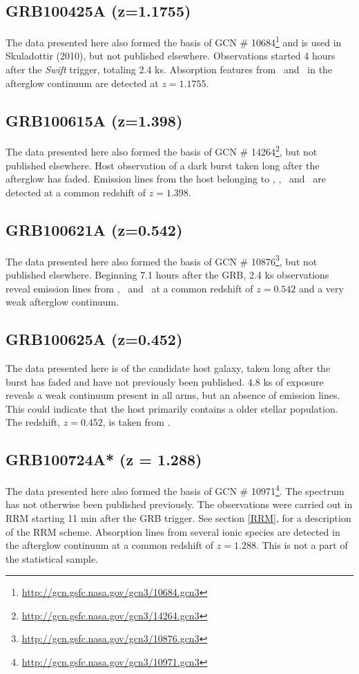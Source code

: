 \documentclass{aa}    %
\begin{document}
\subsection{GRB100425A (z=1.1755)}
The data presented here also formed the basis of GCN \#
10684\footnote{\url{http://gcn.gsfc.nasa.gov/gcn3/10684.gcn3}} and is used in
Skuladottir (2010), but not published elsewhere. Observations started 4
hours after the \textit{Swift} trigger, totaling 2.4 ks. Absorption features
from \mgii~and \feii~in the afterglow continuum are detected at $z=1.1755$.

\subsection{GRB100615A (z=1.398)}
The data presented here also formed the basis of GCN \#
14264\footnote{\url{http://gcn.gsfc.nasa.gov/gcn3/14264.gcn3}}, but not
published elsewhere. Host observation of a dark burst\citep{DElia2011} taken
long after the afterglow has faded. Emission lines from the host belonging to
\oii, \neiii, \oiii~and \ha~are detected at a common redshift of $z=1.398$.

\subsection{GRB100621A (z=0.542)}
The data presented here also formed the basis of GCN \#
10876\footnote{\url{http://gcn.gsfc.nasa.gov/gcn3/10876.gcn3}}, but not
published elsewhere. Beginning 7.1 hours after the GRB, 2.4 ks observations
reveal emission lines from \oii, \hb~and \oiii~at a common redshift of
$z=0.542$ and a very weak afterglow continuum.

\subsection{GRB100625A (z=0.452)}
The data presented here is of the candidate host galaxy, taken long after the
burst has faded and have not previously been published. 4.8 ks of exposure
reveals a weak continuum present in all arms, but an absence of emission lines.
This could indicate that the host primarily contains a older stellar
population. The redshift, $z=0.452$, is taken from \citet{Fong2013}.


\subsection{GRB100724A* (z = 1.288)}
The data presented here also formed the basis of GCN \#
10971\footnote{\url{http://gcn.gsfc.nasa.gov/gcn3/10971.gcn3}}. The spectrum
has not otherwise been published previously. The observations were carried out
in RRM starting 11 min after the GRB trigger. See section \ref{RRM}, for a
description of the RRM scheme. Absorption lines from several ionic species are
detected in the afterglow continuum at a common redshift of $z = 1.288$. This
is not a part of the statistical sample.
\end{document}
